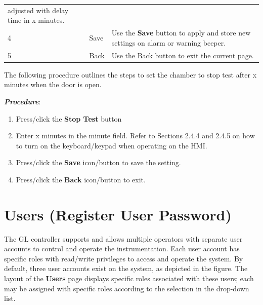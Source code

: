 \begin{longtable}[]{@{}lll@{}}
\begin{minipage}[t]{0.65\columnwidth}
adjusted with delay time in x minutes.\strut
\end{minipage}\tabularnewline
\begin{minipage}[t]{0.04\columnwidth}\raggedright
4\strut
\end{minipage} & \begin{minipage}[t]{0.23\columnwidth}\raggedright
Save\strut
\end{minipage} & \begin{minipage}[t]{0.65\columnwidth}\raggedright
Use the \textbf{Save} button to apply and store new settings on alarm or
warning beeper.\strut
\end{minipage}\tabularnewline
\begin{minipage}[t]{0.04\columnwidth}\raggedright
5\strut
\end{minipage} & \begin{minipage}[t]{0.23\columnwidth}\raggedright
Back\strut
\end{minipage} & \begin{minipage}[t]{0.65\columnwidth}\raggedright
Use the Back button to exit the current page.\strut
\end{minipage}\tabularnewline
\bottomrule
\end{longtable}

The following procedure outlines the steps to set the chamber to stop
test after x minutes when the door is open.

\textbf{\emph{Procedure}}:

\begin{enumerate}
\def\labelenumi{\arabic{enumi}.}
\tightlist
\item
  Press/click the \textbf{Stop Test} button
\item
  Enter x minutes in the minute field. Refer to Sections 2.4.4 and 2.4.5
  on how to turn on the keyboard/keypad when operating on the HMI.\\
\item
  Press/click the \textbf{Save} icon/button to save the setting.
\item
  Press/click the \textbf{Back} icon/button to exit.
\end{enumerate}


\section{Users (Register User
Password)}

The GL controller supports and allows multiple operators with separate
user accounts to control and operate the instrumentation. Each user
account has specific roles with read/write privileges to access and
operate the system. By default, three user accounts exist on the system,
as depicted in the figure. The layout of the \textbf{Users} page
displays specific roles associated with these users; each may be
assigned with specific roles according to the selection in the drop-down
list.

